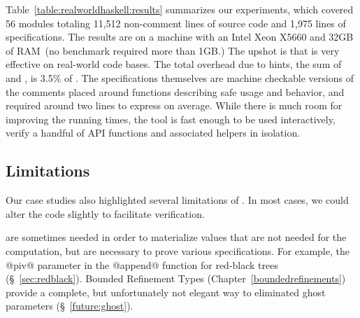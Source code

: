 Table~\ref{table:realworldhaskell:results} summarizes our experiments, which covered 56 modules
totaling 11,512 non-comment lines of source code and 1,975 lines of specifications.
%
The results are on a machine with an Intel Xeon X5660 and 32GB of RAM~(no benchmark required more than 1GB.)
%
The upshot is that \toolname is very effective on real-world code bases.
%
The total overhead due to hints, \ie the sum of \bfAnnot and \bfQualif, is 3.5\% of \bfLOC.
%
The specifications themselves are machine checkable versions of the comments 
placed around functions describing safe usage and behavior, and required around
two lines to express on average.
%
%
%
%
While there is much room for improving the running times, the tool is fast enough 
to be used interactively, verify a handful of API functions and associated helpers 
in isolation.

\subsection{Limitations}\label{sec:discussion}

Our case studies also highlighted several limitations
of \toolname. 
In most cases, we could alter the code slightly to 
facilitate verification. 

 are sometimes needed in 
order to materialize values that are not needed 
for the computation, but are necessary to prove 
various specifications. For example, the @piv@ 
parameter in the @append@ function for red-black trees
(\S~\ref{sec:redblack}).
%
Bounded Refinement Types (Chapter~\ref{boundedrefinements})
provide a complete, but unfortunately not elegant way to 
eliminated ghost parameters (\S~\ref{future:ghost}).

